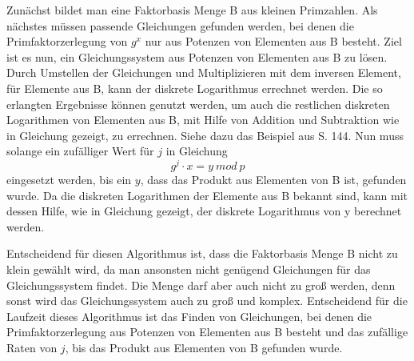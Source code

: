 		Zunächst bildet man eine Faktorbasis Menge B aus kleinen Primzahlen. Als nächstes müssen passende Gleichungen gefunden werden, bei denen die Primfaktorzerlegung von $g^x$ nur aus Potenzen von Elementen aus B besteht. Ziel ist es nun, ein Gleichungssystem aus Potenzen von Elementen aus B zu lösen. Durch Umstellen der Gleichungen und Multiplizieren mit dem inversen Element, für Elemente aus B, kann der diskrete Logarithmus errechnet werden. Die so erlangten Ergebnisse können genutzt werden, um auch die restlichen diskreten Logarithmen von Elementen aus B, mit Hilfe von Addition und Subtraktion wie in Gleichung  gezeigt, zu errechnen. Siehe dazu das Beispiel aus \cite{Elliptic:Curves:Number:Theory:and:Cryptography} S. 144. Nun muss solange ein zufälliger Wert für $j$ in Gleichung
		\begin{equation}
			g^j \cdot x = y~mod~p
			\label{Gleichung Diskreten Logarithmus Gleichung 2}
		\end{equation}
		eingesetzt werden, bis ein $y$, dass das Produkt aus Elementen von B ist, gefunden wurde. Da die diskreten Logarithmen der Elemente aus B bekannt sind, kann mit dessen Hilfe, wie in Gleichung  gezeigt, der diskrete Logarithmus von y berechnet werden.
		
		Entscheidend für diesen Algorithmus ist, dass die Faktorbasis Menge B nicht zu klein gewählt wird, da man ansonsten nicht genügend Gleichungen für das Gleichungssystem findet. Die Menge darf aber auch nicht zu groß werden, denn sonst wird das Gleichungssystem auch zu groß und komplex. Entscheidend für die Laufzeit dieses Algorithmus ist das Finden von Gleichungen, bei denen die Primfaktorzerlegung aus Potenzen von Elementen aus B besteht und das zufällige Raten von $j$, bis das Produkt aus Elementen von B gefunden wurde.